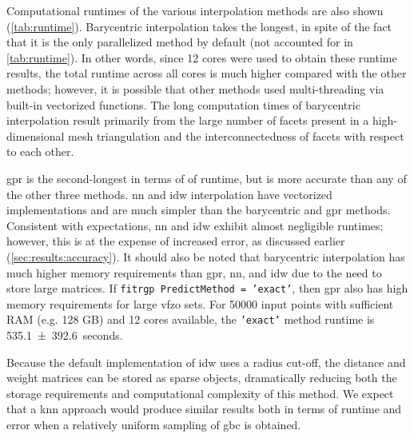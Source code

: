 \documentclass[final,twocolumn,12pt]{elsarticle}
\begin{document}
{Computational runtimes of the various interpolation methods are also shown (\cref{tab:runtime}). Barycentric interpolation takes the longest, in spite of the fact that it is the only parallelized method by default (not accounted for in \cref{tab:runtime}). In other words, since 12 cores were used to obtain these runtime results, the total runtime across all cores is much higher compared with the other methods; however, it is possible that other methods used multi-threading via built-in vectorized functions. The long computation times of barycentric interpolation result primarily from the large number of facets present in a high-dimensional mesh triangulation and the interconnectedness of facets with respect to each other.

\Gls{gpr} is the second-longest in terms of of runtime, but is more accurate than any of the other three methods. \Gls{nn} and \gls{idw} interpolation have vectorized implementations and are much simpler than the barycentric and \gls{gpr} methods. Consistent with expectations, \gls{nn} and \gls{idw} exhibit almost negligible runtimes; however, this is at the expense of increased error, as discussed earlier (\cref{sec:results:accuracy}). It should also be noted that barycentric interpolation has much higher memory requirements than \gls{gpr}, \gls{nn}, and \gls{idw} due to the need to store large matrices. If \texttt{fitrgp PredictMethod = 'exact'}, then \gls{gpr} also has high memory requirements for large \gls{vfzo} sets. For \num{50000} input points with sufficient RAM (e.g. 128 GB) and 12 cores available, the \texttt{'exact'} method runtime is \SI{535.1 \pm 392.6}{seconds}.

Because the default implementation of \gls{idw} uses a radius cut-off, the distance and weight matrices can be stored as sparse objects, dramatically reducing both the storage requirements and computational complexity of this method. We expect that a \gls{knn} approach would produce similar results both in terms of runtime and error when a relatively uniform sampling of \gls{gbc} is obtained.

}
\end{document}

